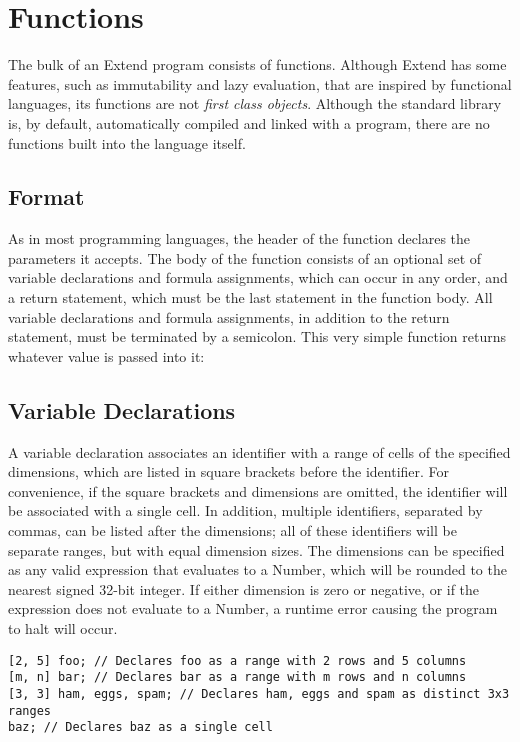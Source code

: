 \section{Functions}
\label{sec:Functions}
The bulk of an Extend program consists of functions. Although Extend has some features, such as immutability and lazy evaluation, that are inspired by functional languages, its functions are not \textit{first class objects}. Although the standard library is, by default, automatically compiled and linked with a program, there are no functions built into the language itself.
\subsection{Format}
\label{sec:funcdecl}
As in most programming languages, the header of the function declares the parameters it accepts. The body of the function consists of an optional set of variable declarations and formula assignments, which can occur in any order, and a return statement, which must be the last statement in the function body. All variable declarations and formula assignments, in addition to the return statement, must be terminated by a semicolon.
This very simple function returns whatever value is passed into it:

\subsection{Variable Declarations}
\label{sec:vardecl}
A variable declaration associates an identifier with a range of cells of the specified dimensions, which are listed in square brackets before the identifier. For convenience, if the square brackets and dimensions are omitted, the identifier will be associated with a single cell. In addition, multiple identifiers, separated by commas, can be listed after the dimensions; all of these identifiers will be separate ranges, but with equal dimension sizes. The dimensions can be specified as any valid expression that evaluates to a Number, which will be rounded to the nearest signed 32-bit integer. If either dimension is zero or negative, or if the expression does not evaluate to a Number, a runtime error causing the program to halt will occur.
\begin{lstlisting}
[2, 5] foo; // Declares foo as a range with 2 rows and 5 columns
[m, n] bar; // Declares bar as a range with m rows and n columns
[3, 3] ham, eggs, spam; // Declares ham, eggs and spam as distinct 3x3 ranges
baz; // Declares baz as a single cell
\end{lstlisting}
